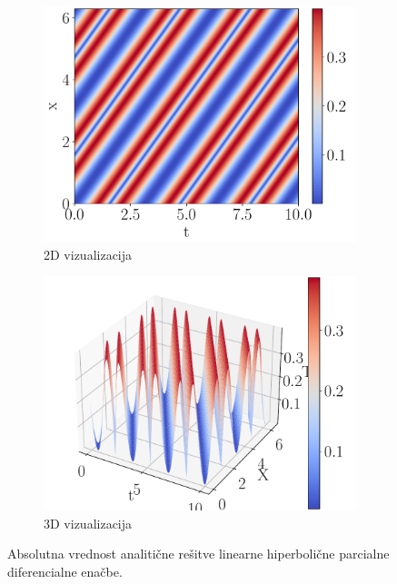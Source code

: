 \documentclass{article}
\begin{document}
\begin{figure}[H]
    \centering
    \begin{subfigure}[b]{0.49\textwidth}
        \centering
        \includegraphics[width=\linewidth]{waveanal2d.pdf}
		\caption{2D vizualizacija}
    \end{subfigure}
    \hfill
    \begin{subfigure}[b]{0.49\textwidth}
        \centering
        \includegraphics[width=\linewidth]{waveanal3d.pdf}
		\caption{3D vizualizacija}
    \end{subfigure}
	\caption{Absolutna vrednost analitične rešitve linearne hiperbolične parcialne diferencialne enačbe.}
\end{figure}
\end{document}

